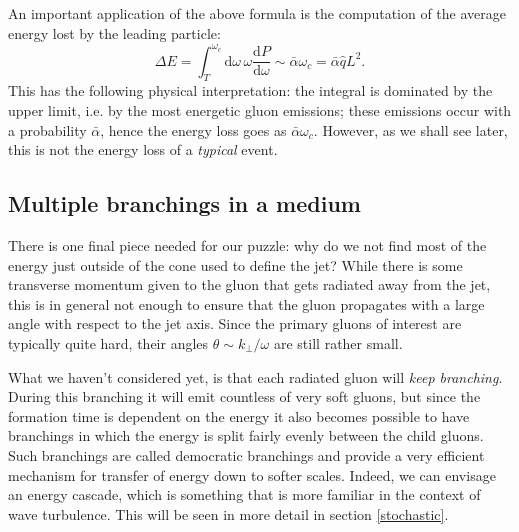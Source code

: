 \documentclass[a4paper,12pt]{article}
\numberwithin{equation}{section}
\begin{document}
An important application of the above formula is the computation of the average energy lost by the leading particle:
\begin{equation}
\Delta E = \int_T^{\omega_c} \mathrm{d}\omega \, \omega \frac{\mathrm{d}P}{\mathrm{d}\omega} \sim \bar{\alpha} \omega_c=\bar{\alpha}\hat{q}L^2.
\end{equation}
This has the following physical interpretation: the integral is dominated by the upper limit, i.e. by the most energetic gluon emissions; these emissions occur with a probability $\bar{\alpha}$, hence the energy loss goes as $\bar{\alpha}\omega_c$. However, as we shall see later, this is not the energy loss of a \emph{typical} event.



\subsection{Multiple branchings in a medium}\label{multiplebranchings}



There is one final piece needed for our puzzle: why do we not find most of the energy just outside of the cone used to define the jet? While there is some transverse momentum given to the gluon that gets radiated away from the jet, this is in general not enough to ensure that the gluon propagates with a large angle with respect to the jet axis. Since the primary gluons of interest are typically quite hard, their angles $\theta \sim k_\perp/\omega$ are still rather small.

What we haven't considered yet, is that each radiated gluon will \emph{keep branching}. During this branching it will emit countless of very soft gluons, but since the formation time is dependent on the energy it also becomes possible to have branchings in which the energy is split fairly evenly between the child gluons. Such branchings are called democratic branchings and provide a very efficient mechanism for transfer of energy down to softer scales. Indeed, we can envisage an energy cascade, which is something that is more familiar in the context of wave turbulence. This will be seen in more detail in section \ref{stochastic}.
\end{document}
